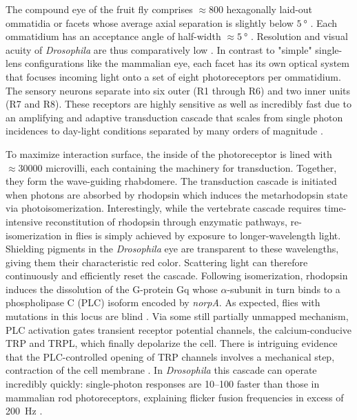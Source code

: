 The compound eye of the fruit fly comprises $\approx 800$ hexagonally laid-out ommatidia or facets whose average axial separation is slightly below $\SI{5}{\degree}$ \citep[for a detailed map of the somewhat inhomogeneous fruit fly eye, as compiled by Erich Buchner, see][]{Heisenberg:1984aa}. Each ommatidium has an acceptance angle of half-width $\approx \SI{5}{\degree}$ \citep{Goetz:1965aa}. Resolution and visual acuity of \textit{Drosophila} are thus comparatively low \citep{Land:1997aa}. In contrast to "simple" single-lens configurations like the mammalian eye, each facet has its own optical system that focuses incoming light onto a set of eight photoreceptors per ommatidium. The sensory neurons separate into six outer (R1 through R6) and two inner units (R7 and R8). These receptors are highly sensitive as well as incredibly fast due to an amplifying and adaptive transduction cascade that scales from single photon incidences to day-light conditions separated by many orders of magnitude \citep{Hardie:2001aa,Hardie:2015aa}.

To maximize interaction surface, the inside of the photoreceptor is lined with $\approx\num{30000}$ microvilli, each containing the machinery for transduction. Together, they form the wave-guiding rhabdomere. The transduction cascade is initiated when photons are absorbed by rhodopsin which induces the metarhodopsin state via photoisomerization. Interestingly, while the vertebrate cascade requires time-intensive reconstitution of rhodopsin through enzymatic pathways, re-isomerization in flies is simply achieved by exposure to longer-wavelength light. Shielding pigments in the \textit{Drosophila} eye are transparent to these wavelengths, giving them their characteristic red color. Scattering light can therefore continuously and efficiently reset the cascade. Following isomerization, rhodopsin induces the dissolution of the G-protein Gq whose $\alpha$-subunit in turn binds to a phospholipase C (PLC) isoform encoded by \textit{norpA}. As expected, flies with mutations in this locus are blind \citep{Bloomquist:1988aa}. Via some still partially unmapped mechanism, PLC activation gates transient receptor potential channels, the calcium-conducive TRP and TRPL, which finally depolarize the cell. There is intriguing evidence that the PLC-controlled opening of TRP channels involves a mechanical step, contraction of the cell membrane \citep{Hardie:2012aa}. In \textit{Drosophila} this cascade can operate incredibly quickly: single-photon responses are \SIrange{10}{100}{\times} faster than those in mammalian rod photoreceptors, explaining flicker fusion frequencies in excess of \SI{200}{\hertz} \citep{Heisenberg:1984aa,Hardie:2015aa}.

